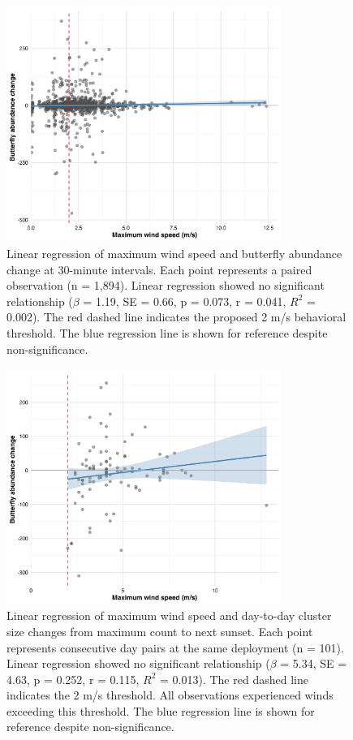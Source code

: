 \begin{figure}[htbp]
    \centering
    \includegraphics[width=0.8\textwidth]{supplemental/results/30_min/figures/wind_vs_change_bivariate_untransformed.png}
    \caption{Linear regression of maximum wind speed and butterfly abundance change at 30-minute intervals. Each point represents a paired observation (n = 1,894). Linear regression showed no significant relationship ($\beta$ = 1.19, SE = 0.66, p = 0.073, r = 0.041, $R^2$ = 0.002). The red dashed line indicates the proposed 2 m/s behavioral threshold. The blue regression line is shown for reference despite non-significance.}
    \label{fig:wind_linear_regression_30min}
\end{figure}

\begin{figure}[htbp]
    \centering
    \includegraphics[width=0.8\textwidth]{supplemental/results/sunset/figures/wind_vs_change_bivariate_untransformed.png}
    \caption{Linear regression of maximum wind speed and day-to-day cluster size changes from maximum count to next sunset. Each point represents consecutive day pairs at the same deployment (n = 101). Linear regression showed no significant relationship ($\beta$ = 5.34, SE = 4.63, p = 0.252, r = 0.115, $R^2$ = 0.013). The red dashed line indicates the 2 m/s threshold. All observations experienced winds exceeding this threshold. The blue regression line is shown for reference despite non-significance.}
    \label{fig:wind_linear_regression_sunset}
\end{figure}


